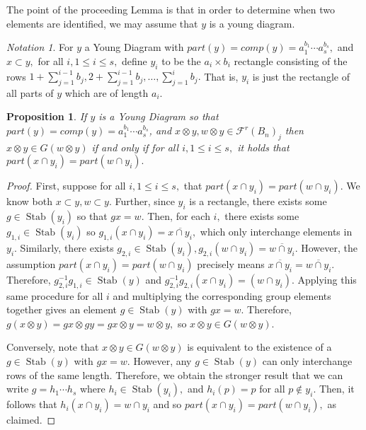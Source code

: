 \documentclass{amsart}
\newtheorem{prop}[thm]{Proposition}
\theoremstyle{remark}
\newtheorem{note}[thm]{Notation}
\def\Stab{\operatorname{Stab}}
\begin{document}
The point of the proceeding Lemma is that in order to determine when two elements are identified, we may assume that $y$ is a young diagram.

\begin{note}
For $y$ a Young Diagram with $part(y) = comp(y) = a_1^{b_1}\cdots a_s^{b_s},$ and $x \subset y,$ for all $i,1 \leq i \leq s,$ define $y_i$ to be the $a_i \times b_i$ rectangle consisting of the rows $1+\sum_{j = 1}^{i-1} b_j,2+\sum_{j = 1}^{i-1} b_j,\ldots, \sum_{j = 1}^{i} b_j.$ That is, $y_i$ is just the rectangle of all parts of $y$ which are of length $a_i.$
\end{note}

\begin{prop}
\label{prop:wreath_orbits}
If $y$ is a Young Diagram so that $part(y) = comp(y) =a_1^{b_1}\cdots a_s^{b_s}$, and $x\otimes y, w \otimes y \in\mathcal F^r(B_n)_j$ then $x\otimes y \in G(w \otimes y)$ if and only if for all $i,1 \leq i \leq s,$ it holds that $part(x\cap y_i) = part(w \cap y_i).$
\end{prop}
\begin{proof}
First, suppose for all $i,1 \leq i \leq s,$ that $part(x\cap y_i) = part(w\cap y_i).$ We know both $x\subset y, w \subset y$. Further, since $y_i$ is a rectangle, there exists some $g \in \Stab(y_i)$ so that $gx = w.$ Then, for each $i,$ there exists some $g_{1,i} \in \Stab(y_i)$ so $g_{1,i}(x \cap y_i)=\overline{x \cap y_i},$ which only interchange elements in $y_i.$ Similarly, there exists $g_{2,i} \in \Stab(y_i),g_{2,i}(w \cap y_i) = \overline{w\cap y_i}.$ However, the assumption $part(x\cap y_i) = part(w\cap y_i)$ precisely means $\overline{x \cap y_i}= \overline{w\cap y_i}.$ Therefore, $g_{2,i}^{-1}g_{1,i} \in \Stab(y)$ and $g_{2,i}^{-1}g_{2,i}(x \cap y_i) = (w \cap y_i).$ Applying this same procedure for all $i$ and multiplying the corresponding group elements together gives an element $g \in \Stab(y)$ with $gx = w.$ Therefore, $g(x\otimes y) = gx \otimes gy = gx \otimes y = w \otimes y,$ so $x\otimes y \in G(w \otimes y).$

Conversely, note that $x\otimes y \in G(w \otimes y)$ is equivalent to the existence of a $g \in \Stab(y)$ with $gx = w.$ However, any $g \in \Stab(y)$ can only interchange rows of the same length. Therefore, we obtain the stronger result that we can write $g = h_1 \cdots h_s$ where $h_i \in \Stab(y_i),$ and $h_i(p) = p$ for all $p \notin y_i.$ Then, it follows that $h_i(x \cap y_i) = w \cap y_i$ and so $part(x\cap y_i) = part(w\cap y_i),$ as claimed.
\end{proof}
\end{document}

